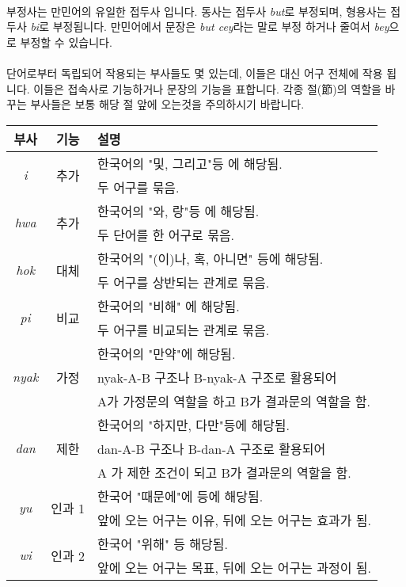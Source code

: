 \documentclass{book}
\begin{document}
            \paragraph{}
    부정사는 만민어의 유일한 접두사 입니다. 동사는 접두사 \textit{but}로 부정되며, 형용사는 접두사 \textit{bi}로 부정됩니다. 만민어에서 문장은 \textit{but cey}라는 말로 부정 하거나 줄여서 \textit{bey}으로 부정할 수 있습니다.
            \paragraph{}
            단어로부터 독립되어 작용되는 부사들도 몇 있는데, 이들은 대신 어구 전체에 작용 됩니다. 이들은 접속사로 기능하거나 문장의 기능을 표합니다. 각종 절(節)의 역할을 바꾸는 부사들은 보통 해당 절 앞에 오는것을 주의하시기 바랍니다. 
                 \begin{center} \footnotesize{}
            \begin{tabular}{|c|c|l|} \hline
                부사 & 기능 & 설명 \\ \hline
                \multirow{2}{*}{\textit{i}} & \multirow{2}{*}{추가} & 한국어의 "및, 그리고"등 에 해당됨. \\ & & 두 어구를 묶음. \\ \hline
                \multirow{2}{*}{\textit{hwa}} & \multirow{2}{*}{추가} & 한국어의 "와, 랑"등 에 해당됨. \\ & & 두 단어를 한 어구로 묶음. \\ \hline
                \multirow{2}{*}{\textit{hok}} & \multirow{2}{*}{대체} & 한국어의 "(이)나, 혹, 아니면" 등에 해당됨. \\ & & 두 어구를 상반되는 관계로 묶음. \\ \hline
                \multirow{2}{*}{\textit{pi}} & \multirow{2}{*}{비교} & 한국어의 "비해" 에 해당됨.\\ && 두 어구를 비교되는 관계로 묶음. \\ \hline
                \multirow{3}{*}{\textit{nyak}} & \multirow{3}{*}{가정} & 한국어의 "만약"에 해당됨.\\  & & nyak-A-B 구조나 B-nyak-A 구조로 활용되어\\  && A가 가정문의 역할을 하고 B가 결과문의 역할을 함.\\ \hline
                \multirow{3}{*}{\textit{dan}} & \multirow{3}{*}{제한} & 한국어의 "하지만, 다만"등에 해당됨. \\  && dan-A-B 구조나 B-dan-A 구조로 활용되어 \\ && A 가 제한 조건이 되고 B가 결과문의 역할을 함. \\ \hline
                \multirow{2}{*}{\textit{yu}} & \multirow{2}{*}{인과 1} & 한국어 "때문에"에 등에 해당됨.\\  && 앞에 오는 어구는 이유, 뒤에 오는 어구는 효과가 됨. \\ \hline
                \multirow{2}{*}{\textit{wi}} & \multirow{2}{*}{인과 2} & 한국어 "위해" 등 해당됨.\\ && 앞에 오는 어구는 목표, 뒤에 오는 어구는 과정이 됨. \\ \hline
                \end{tabular}
        \end{center}\normalsize{}
        \vfill\newpage
\end{document}
